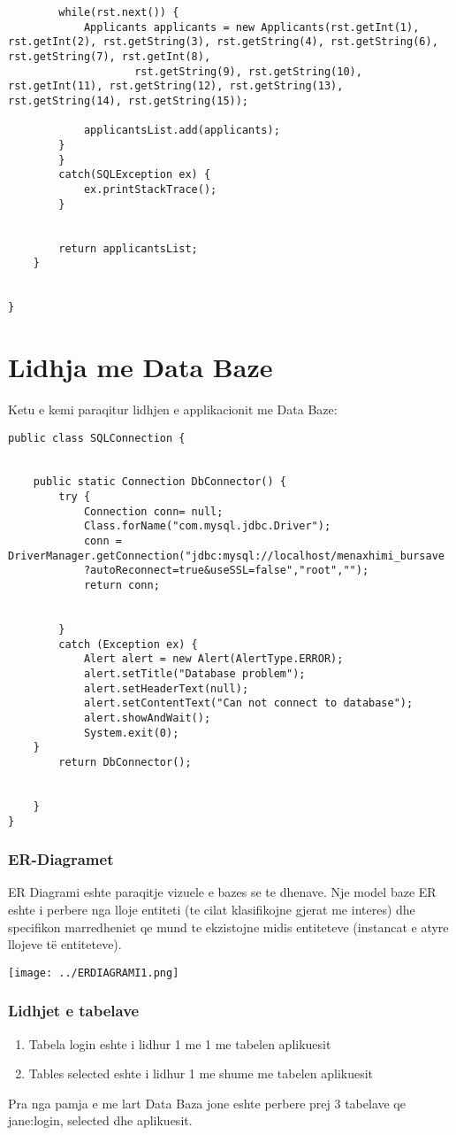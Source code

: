 \documentclass[a4paper]{article}
\begin{document}
\begin{lstlisting}
		while(rst.next()) {
			Applicants applicants = new Applicants(rst.getInt(1), rst.getInt(2), rst.getString(3), rst.getString(4), rst.getString(6), rst.getString(7), rst.getInt(8), 
					rst.getString(9), rst.getString(10), rst.getInt(11), rst.getString(12), rst.getString(13), rst.getString(14), rst.getString(15));
			
			applicantsList.add(applicants);
		}
		}
		catch(SQLException ex) {
			ex.printStackTrace();
		}
		

		return applicantsList;
	}
	
	
}

\end{lstlisting}
\newpage
\section{Lidhja me Data Baze}
Ketu e kemi paraqitur lidhjen e applikacionit me Data Baze:
\begin{lstlisting}
public class SQLConnection {
	
	
	public static Connection DbConnector() {
		try {
			Connection conn= null;
			Class.forName("com.mysql.jdbc.Driver");
			conn = DriverManager.getConnection("jdbc:mysql://localhost/menaxhimi_bursave
			?autoReconnect=true&useSSL=false","root","");
			return conn;

			
		}
		catch (Exception ex) {
			Alert alert = new Alert(AlertType.ERROR);
			alert.setTitle("Database problem");
			alert.setHeaderText(null);
			alert.setContentText("Can not connect to database");
			alert.showAndWait();
			System.exit(0);
	}
		return DbConnector();
		
	
	}
}

\end{lstlisting}
\newpage
\subsubsection{ER-Diagramet}
ER Diagrami eshte paraqitje vizuele e bazes se te dhenave. Nje model baze ER eshte i perbere nga lloje
entiteti (te cilat klasifikojne gjerat me interes) dhe specifikon marredheniet qe mund te ekzistojne midis
entiteteve (instancat e atyre llojeve të entiteteve).
\vspace*{1cm}
\begin{center}
\texttt{[image: ../ERDIAGRAMI1.png]}  
\end{center}
\subsubsection{Lidhjet e tabelave}
\begin{enumerate}
\item  Tabela login eshte i lidhur 1 me 1 me tabelen aplikuesit
\item Tables selected eshte i lidhur 1 me shume me tabelen aplikuesit
\end{enumerate}
Pra nga pamja e me lart Data Baza jone eshte perbere prej 3 tabelave  qe jane:login, selected dhe aplikuesit.
 \newpage
\end{document}
